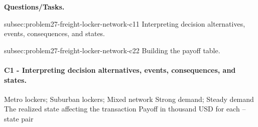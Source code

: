 	\textbf{Questions/Tasks.}
	\begin{enumerate}
	\CriterionTask
	{subsec:problem27-freight-locker-network-c1}{1}
	{Interpreting decision alternatives, events, consequences, and states.}

	\CriterionTask
	{subsec:problem27-freight-locker-network-c2}{2}
	{Building the payoff table.}
	\end{enumerate}

	\paragraph*{C1 - Interpreting decision alternatives, events, consequences, and states.}
	\label{subsec:problem27-freight-locker-network-c1}
	\DecisionElementsTable
	{Metro lockers; Suburban lockers; Mixed network}
	{Strong demand; Steady demand}
	{The realized state affecting the transaction}
	{Payoff in thousand USD for each --state pair}

